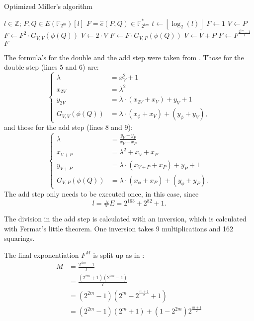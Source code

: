 \begin{algorithm}[h]
	\caption[Optimized Miller's algorithm]{Optimized Miller's algorithm \cite{barreto-efficient}}
	\label{algorithm-miller}
	\begin{algorithmic}[1]
		\REQUIRE $l \in \mathbb{Z}$; $P, Q \in E(\mathbb{F}_{2^m})[l]$
		\ENSURE $F = \hat{e}(P, Q) \in \mathbb{F}_{2^{km}}^*$
		\STATE $t \gets \left\lfloor \log _2 (l) \right\rfloor$
		\STATE $F \gets 1$
		\STATE $V \gets P$
			\STATE $F \gets F^2 \cdot G_{V,V}(\phi(Q))$
			\STATE $V \gets 2 \cdot V$
				\STATE $F \gets F \cdot G_{V,P}(\phi(Q))$
				\STATE $V \gets V + P$
			\ENDIF
		\ENDFOR
		\STATE $F \gets F^{\frac{2^{km} - 1 }{l}}$
		\RETURN $F$
	\end{algorithmic}
\end{algorithm}

The formula's for the double and the add step were taken from \cite{bertoni}. Those for the double step (lines 5 and 6) are:
\begin{displaymath}\begin{cases}
	\lambda &= x_V^2 + 1\\
	x_{2V} &= \lambda ^2\\
	y_{2V} &= \lambda \cdot (x_{2V} + x_V) + y_V + 1\\
	G_{V,V}(\phi(Q)) &= \lambda \cdot (x_{\phi} + x_V) + (y_{\phi} + y_V),
\end{cases}\end{displaymath}
and those for the add step (lines 8 and 9):
\begin{displaymath}\begin{cases}
	\lambda &= \frac{y_V + y_P}{x_V + x_P}\\
	x_{V + P} &= \lambda ^2 + x_V + x_P\\
	y_{V + P} &= \lambda \cdot (x_{V + P} + x_P) + y_P + 1\\
	G_{V,P}(\phi(Q)) &= \lambda \cdot (x_{\phi} + x_P) + (y_{\phi} + y_P).
\end{cases}\end{displaymath}
The add step only needs to be executed once, in this case, since
\begin{displaymath}l = \#E = 2^{163} + 2^{82} + 1.\end{displaymath}

The division in the add step is calculated with an inversion, which is calculated with Fermat's little theorem. One inversion takes 9 multiplications and 162 squarings.

The final exponentiation $F^M$ is split up as in \cite{beuchat}:
\begin{displaymath}\begin{aligned}
M	&= \frac{2^{4m} - 1}{l}\\
	&= \frac{(2^{2m} + 1)(2^{2m} - 1)}{l}\\
	&= (2^{2m} - 1)(2^m - 2^{\frac{m + 1}{2}} + 1)\\
	&= (2^{2m} - 1)(2^m + 1) + (1 - 2^{2m})2^{\frac{m + 1}{2}}\\
\end{aligned}\end{displaymath}
